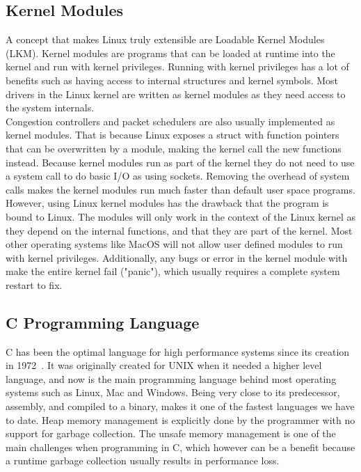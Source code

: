 \documentclass[a4paper,english, 11pt]{report}
\begin{document}
\subsection{Kernel Modules}
A concept that makes Linux truly extensible are Loadable Kernel Modules (LKM). Kernel modules are programs that can be loaded at runtime into the kernel and run with kernel privileges. Running with kernel privileges has a lot of benefits such as having access to internal structures and kernel symbols. Most drivers in the Linux kernel are written as kernel modules as they need access to the system internals.\\

Congestion controllers and packet schedulers are also usually implemented as kernel modules. That is because Linux exposes a struct with function pointers that can be overwritten by a module, making the kernel call the new functions instead. Because kernel modules run as part of the kernel they do not need to use a system call to do basic I/O as using sockets. Removing the overhead of system calls makes the kernel modules run much faster than default user space programs.\\

However, using Linux kernel modules has the drawback that the program is bound to Linux. The modules will only work in the context of the Linux kernel as they depend on the internal functions, and that they are part of the kernel. Most other operating systems like MacOS will not allow user defined modules to run with kernel privileges. Additionally, any bugs or error in the kernel module with make the entire kernel fail ("panic"), which usually requires a complete system restart to fix.

\subsection{C Programming Language}
C has been the optimal language for high performance systems since its creation in 1972~\cite{c_programming_language}. It was originally created for UNIX when it needed a higher level language, and now is the main programming language behind most operating systems such as Linux, Mac and Windows. Being very close to its predecessor, assembly, and compiled to a binary, makes it one of the fastest languages we have to date. Heap memory management is explicitly done by the programmer with no support for garbage collection. The unsafe memory management is one of the main challenges when programming in C, which however can be a benefit because a runtime garbage collection usually results in performance loss.
\end{document}
